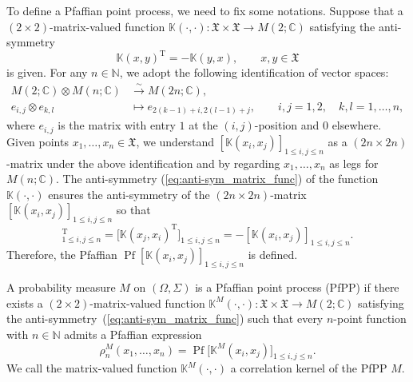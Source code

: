 \documentclass[11pt]{article}
\numberwithin{equation}{section}
\numberwithin{equation}{section}
\newcommand{\pf}{\operatorname{Pf}}
\newcommand{\mfrak}[1]{\mathfrak{#1}}
\newcommand{\mbb}[1]{\mathbb{#1}}
\newcommand{\mrm}[1]{\mathrm{#1}}
\begin{document}
To define a Pfaffian point process, we need to fix some notations.
Suppose that a $(2\times 2)$-matrix-valued function $\mbb{K}(\cdot,\cdot)\colon \mfrak{X}\times\mfrak{X}\to M(2;\mbb{C})$ satisfying the anti-symmetry
\begin{equation}\label{eq:anti-sym_matrix_func}
	\mbb{K}(x,y)^{\mrm{T}}=-\mbb{K}(y,x),\qquad x, y\in\mfrak{X}
\end{equation}
is given. For any $n\in\mbb{N}$, we adopt the following identification of vector spaces:
\begin{align*}
	M(2;\mbb{C})\otimes M(n;\mbb{C}) & \xrightarrow{\sim} M(2n;\mbb{C}),\\
	 e_{i,j}\otimes e_{k,l}&\mapsto e_{2(k-1)+i, 2(l-1)+j},\qquad i,j=1,2,\quad k,l=1,\dots, n,
\end{align*}
where $e_{i,j}$ is the matrix with entry $1$ at the $(i,j)$-position and $0$ elsewhere.
Given points $x_{1},\dots, x_{n}\in\mfrak{X}$, we understand $[\mbb{K}(x_{i},x_{j})]_{1\le i,j\le n}$ as a $(2n\times 2n)$-matrix under the above identification and by regarding $x_{1},\dots, x_{n}$ as legs for $M(n;\mbb{C})$. The anti-symmetry (\ref{eq:anti-sym_matrix_func}) of the function $\mbb{K}(\cdot,\cdot)$ ensures the anti-symmetry of the $(2n\times 2n)$-matrix $[\mbb{K}(x_{i},x_{j})]_{1\le i,j\le n}$ so that
\begin{equation*}
[\mbb{K}(x_{i},x_{j})]_{1\le i,j\le n}^{\mrm{T}}=\big[\mbb{K}(x_{j},x_{i})^{\mrm{T}}\big]_{1\le i,j\le n}=-[\mbb{K}(x_{i},x_{j})]_{1\le i,j\le n}.
\end{equation*}
Therefore, the Pfaffian $\pf [\mbb{K}(x_{i},x_{j})]_{1\le i,j\le n}$ is defined.

\begin{Definition}
A probability measure $M$ on $(\Omega,\Sigma)$ is a Pfaffian point process (PfPP) if there exists a $(2\times 2)$-matrix-valued function $\mbb{K}^{M}(\cdot,\cdot)\colon \mfrak{X}\times\mfrak{X}\to M(2;\mbb{C})$ satisfying the anti-symmetry~(\ref{eq:anti-sym_matrix_func}) such that every $n$-point function with $n\in\mbb{N}$ admits a Pfaffian expression
\begin{equation*}
	\rho_{n}^{M}(x_{1},\dots, x_{n})=\pf \big[\mbb{K}^{M}(x_{i},x_{j})\big]_{1\le i,j\le n}.
\end{equation*}
We call the matrix-valued function $\mbb{K}^{M}(\cdot,\cdot)$ a correlation kernel of the PfPP $M$.
\end{Definition}
\end{document}
